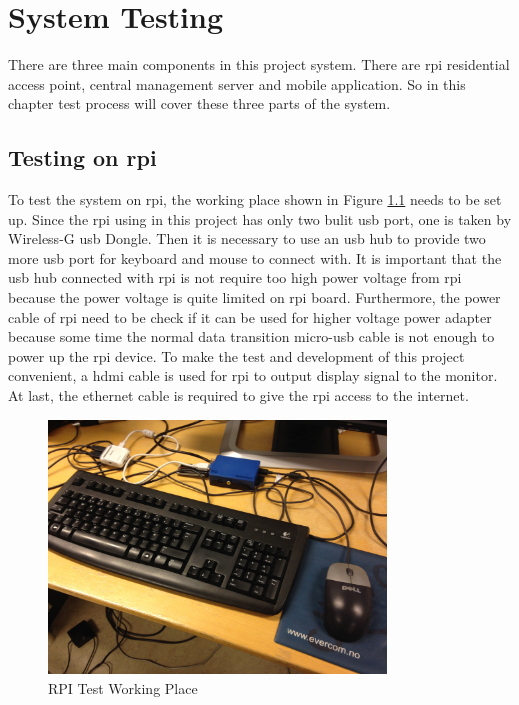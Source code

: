 \chapter{System Testing}
\label{chp:system_test}
\par There are three main components in this project system. There are \gls{rpi} residential access point, central management server and mobile application. So in this chapter test process will cover these three parts of the system.

\section{Testing on \gls{rpi}}
\par To test the system on \gls{rpi}, the working place shown in Figure \ref{fig:rpi_test} needs to be set up. Since the \gls{rpi} using in this project has only two bulit \gls{usb} port, one is taken by Wireless-G \gls{usb} Dongle. Then it is necessary to use an \gls{usb} hub to provide two more \gls{usb} port for keyboard and mouse to connect with. It is important that the \gls{usb} hub connected with \gls{rpi} is not require too high power voltage from \gls{rpi} because the power voltage is quite limited on \gls{rpi} board. Furthermore, the power cable of \gls{rpi} need to be check if it can be used for higher voltage power adapter because some time the normal data transition micro-usb cable is not enough to power up the \gls{rpi} device. To make the test and development of this project convenient, a \gls{hdmi} cable is used for \gls{rpi} to output display signal to the monitor. At last, the ethernet cable is required to give the \gls{rpi} access to the internet.

\begin{figure}
	\centering
    	\includegraphics[width=0.80\textwidth,natwidth=610,natheight=642]{figs/rpi_test.JPG}
  	\caption{RPI Test Working Place}
  	\label{fig:rpi_test}
\end{figure}

